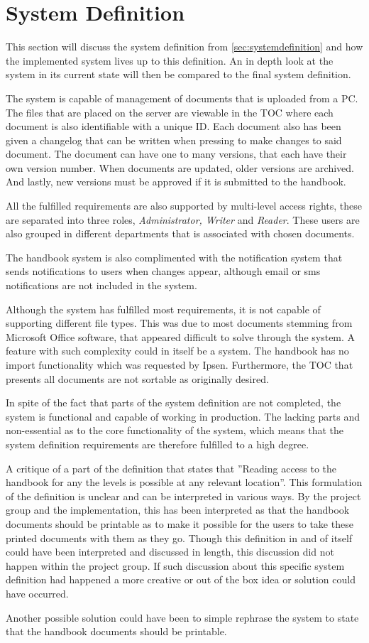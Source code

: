 \section{System Definition}\label{sec:dissystemdef}

This section will discuss the system definition from \cref{sec:systemdefinition} and how the implemented system lives up to this definition.
An in depth look at the system in its current state will then be compared to the final system definition.

The system is capable of management of documents that is uploaded from a PC.
The files that are placed on the server are viewable in the TOC where each document is also identifiable with a unique ID.
Each document also has been given a changelog that can be written when pressing to make changes to said document.
The document can have one to many versions, that each have their own version number.
When documents are updated, older versions are archived.
And lastly, new versions must be approved if it is submitted to the handbook.

All the fulfilled requirements are also supported by multi-level access rights, these are separated into three roles, \textit{Administrator, Writer} and \textit{Reader}.
These users are also grouped in different departments that is associated with chosen documents.

The handbook system is also complimented with the notification system that sends notifications to users when changes appear, although email or sms notifications are not included in the system.

Although the system has fulfilled most requirements, it is not capable of supporting different file types.
This was due to most documents stemming from Microsoft Office software, that appeared difficult to solve through the system.
A feature with such complexity could in itself be a system.
The handbook has no import functionality which was requested by Ipsen.
Furthermore, the TOC that presents all documents are not sortable as originally desired.

In spite of the fact that parts of the system definition are not completed, the system is functional and capable of working in production.
The lacking parts and non-essential as to the core functionality of the system, which means that the system definition requirements are therefore fulfilled to a high degree.

A critique of a part of the definition that states that ''Reading access to the handbook for any the levels is possible at any relevant location''.
This formulation of the definition is unclear and can be interpreted in various ways.
By the project group and the implementation, this has been interpreted as that the handbook documents should be printable as to make it possible for the users to take these printed documents with them as they go.
Though this definition in and of itself could have been interpreted and discussed in length, this discussion did not happen within the project group.
If such discussion about this specific system definition had happened a more creative or out of the box idea or solution could have occurred.

Another possible solution could have been to simple rephrase the system to state that the handbook documents should be printable.

